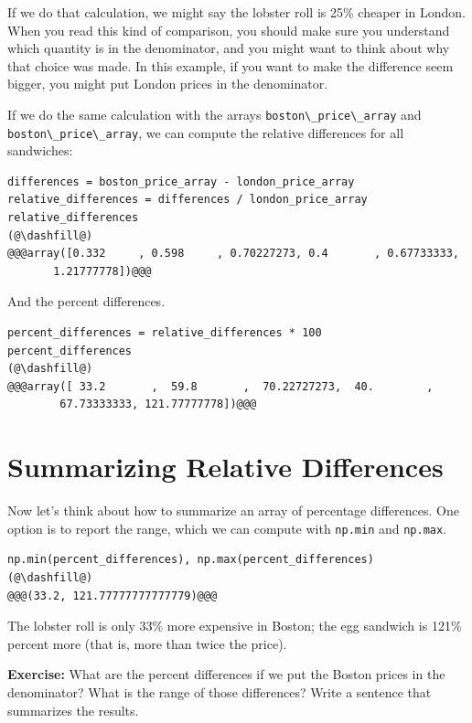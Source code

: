 If we do that calculation, we might say the lobster roll is 25\% cheaper
in London. When you read this kind of comparison, you should make sure
you understand which quantity is in the denominator, and you might want
to think about why that choice was made. In this example, if you want to
make the difference seem bigger, you might put London prices in the
denominator.

If we do the same calculation with the arrays
\passthrough{\lstinline!boston\_price\_array!} and
\passthrough{\lstinline!boston\_price\_array!}, we can compute the
relative differences for all sandwiches:

\begin{lstlisting}[]
differences = boston_price_array - london_price_array
relative_differences = differences / london_price_array
relative_differences
(@\dashfill@)
@@@array([0.332     , 0.598     , 0.70227273, 0.4       , 0.67733333,
       1.21777778])@@@
\end{lstlisting}

And the percent differences.

\begin{lstlisting}[]
percent_differences = relative_differences * 100
percent_differences
(@\dashfill@)
@@@array([ 33.2       ,  59.8       ,  70.22727273,  40.        ,
        67.73333333, 121.77777778])@@@
\end{lstlisting}

\hypertarget{summarizing-relative-differences}{%
\section{Summarizing Relative
Differences}\label{summarizing-relative-differences}}

Now let's think about how to summarize an array of percentage
differences. One option is to report the range, which we can compute
with \passthrough{\lstinline!np.min!} and
\passthrough{\lstinline!np.max!}.

\begin{lstlisting}[]
np.min(percent_differences), np.max(percent_differences)
(@\dashfill@)
@@@(33.2, 121.77777777777779)@@@
\end{lstlisting}

The lobster roll is only 33\% more expensive in Boston; the egg sandwich
is 121\% percent more (that is, more than twice the price).

\textbf{Exercise:} What are the percent differences if we put the Boston
prices in the denominator? What is the range of those differences? Write
a sentence that summarizes the results.

